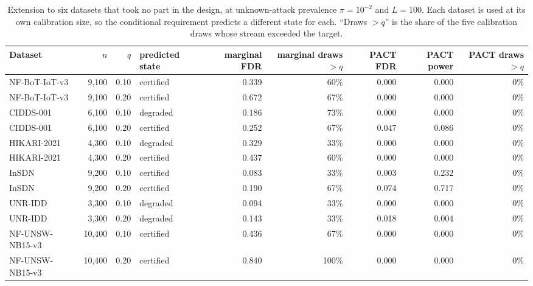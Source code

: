 \documentclass[a4paper,fleqn]{cas-dc}
\newcommand{\PACT}{PACT\xspace}
\begin{document}
\begin{table}[t]
\centering
\caption{Extension to six datasets that took no part in the design, at unknown-attack prevalence $\pi=10^{-2}$ and $L=100$. Each dataset is used at its own calibration size, so the conditional requirement predicts a different state for each. ``Draws $>q$'' is the share of the five calibration draws whose stream exceeded the target.}
\label{tab:extension}
\scriptsize
\setlength{\tabcolsep}{4pt}
\begin{tabular}{lrrlrrrrr}
\toprule
Dataset & $n$ & $q$ & predicted state & marginal FDR & marginal draws $>q$ & \PACT FDR & \PACT power & \PACT draws $>q$ \\
\midrule
NF-BoT-IoT-v3 & 9,100 & 0.10 & certified & 0.339 & 60\% & 0.000 & 0.000 & 0\% \\
NF-BoT-IoT-v3 & 9,100 & 0.20 & certified & 0.672 & 67\% & 0.000 & 0.000 & 0\% \\
CIDDS-001 & 6,100 & 0.10 & degraded & 0.186 & 73\% & 0.000 & 0.000 & 0\% \\
CIDDS-001 & 6,100 & 0.20 & certified & 0.252 & 67\% & 0.047 & 0.086 & 0\% \\
HIKARI-2021 & 4,300 & 0.10 & degraded & 0.329 & 33\% & 0.000 & 0.000 & 0\% \\
HIKARI-2021 & 4,300 & 0.20 & certified & 0.437 & 60\% & 0.000 & 0.000 & 0\% \\
InSDN & 9,200 & 0.10 & certified & 0.083 & 33\% & 0.003 & 0.232 & 0\% \\
InSDN & 9,200 & 0.20 & certified & 0.190 & 67\% & 0.074 & 0.717 & 0\% \\
UNR-IDD & 3,300 & 0.10 & degraded & 0.094 & 33\% & 0.000 & 0.000 & 0\% \\
UNR-IDD & 3,300 & 0.20 & degraded & 0.143 & 33\% & 0.018 & 0.004 & 0\% \\
NF-UNSW-NB15-v3 & 10,400 & 0.10 & certified & 0.436 & 67\% & 0.000 & 0.000 & 0\% \\
NF-UNSW-NB15-v3 & 10,400 & 0.20 & certified & 0.840 & 100\% & 0.000 & 0.000 & 0\% \\
\bottomrule
\end{tabular}
\end{table}
\end{document}

